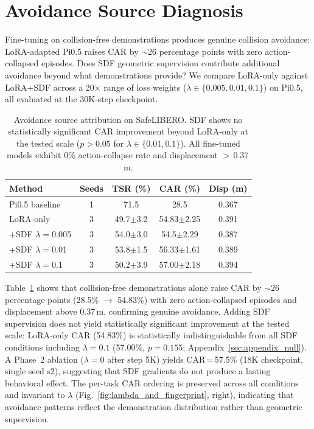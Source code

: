 \section{Avoidance Source Diagnosis}\label{sec:avoidance_source}

Fine-tuning on collision-free demonstrations produces genuine collision avoidance: LoRA-adapted Pi0.5 raises CAR by ${\sim}$26 percentage points with zero action-collapsed episodes. Does SDF geometric supervision contribute additional avoidance beyond what demonstrations provide? We compare LoRA-only against LoRA+SDF across a 20$\times$ range of loss weights ($\lambda \in \{0.005, 0.01, 0.1\}$) on Pi0.5, all evaluated at the 30K-step checkpoint.

\begin{table}[t]
\centering
\caption{Avoidance source attribution on SafeLIBERO. SDF shows no statistically significant CAR improvement beyond LoRA-only at the tested scale ($p > 0.05$ for $\lambda \in \{0.01, 0.1\}$). All fine-tuned models exhibit 0\% action-collapse rate and displacement $>$\,0.37\,m.}
\label{tab:avoidance_source}
\vspace{2pt}
\footnotesize
\begin{tabular*}{\columnwidth}{l@{\extracolsep{\fill}}cccc}
\toprule
Method & Seeds & TSR (\%) & CAR (\%) & Disp (m) \\
\midrule
Pi0.5 baseline & 1 & 71.5 & 28.5 & 0.367 \\
\midrule
LoRA-only & 3 & 49.7$\pm$3.2 & 54.83$\pm$2.25 & 0.391 \\
+SDF $\lambda{=}$0.005 & 3 & 54.0$\pm$3.0 & 54.5$\pm$2.29 & 0.387 \\
+SDF $\lambda{=}$0.01 & 3 & 53.8$\pm$1.5 & 56.33$\pm$1.61 & 0.389 \\
+SDF $\lambda{=}$0.1 & 3 & 50.2$\pm$3.9 & 57.00$\pm$2.18 & 0.394 \\
\bottomrule
\end{tabular*}
\vspace{1pt}
\end{table}

Table~\ref{tab:avoidance_source} shows that collision-free demonstrations alone raise CAR by ${\sim}$26 percentage points (28.5\% $\to$ 54.83\%) with zero action-collapsed episodes and displacement above 0.37\,m, confirming genuine avoidance. Adding SDF supervision does not yield statistically significant improvement at the tested scale: LoRA-only CAR (54.83\%) is statistically indistinguishable from all SDF conditions including $\lambda = 0.1$ (57.00\%, $p = 0.155$; Appendix~\ref{sec:appendix_null}). A Phase~2 ablation ($\lambda = 0$ after step 5K) yields CAR\,=\,57.5\% (18K checkpoint, single seed s2), suggesting that SDF gradients do not produce a lasting behavioral effect. The per-task CAR ordering is preserved across all conditions and invariant to $\lambda$ (Fig.~\ref{fig:lambda_and_fingerprint}, right), indicating that avoidance patterns reflect the demonstration distribution rather than geometric supervision.


